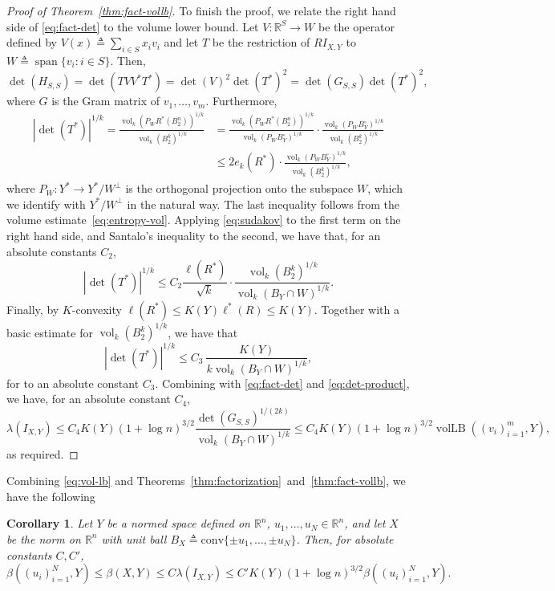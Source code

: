 \documentclass{article}
\newtheorem{corollary}[theorem]{Corollary}
\newcommand{\R}{{\mathbb{R}}}
\newcommand{\eqdef}{\triangleq}
\DeclareMathOperator{\vollb}{volLB}
\DeclareMathOperator{\vol}{vol}
\DeclareMathOperator{\lspan}{span}
\begin{document}
\begin{proof}[Proof of Theorem~\ref{thm:fact-vollb}]
  To finish the proof, we relate the right hand side of
  \eqref{eq:fact-det} to the volume lower bound. Let $V:\R^S \to W$ be
  the operator defined by $V(x) \eqdef \sum_{i \in S}{x_i v_i}$ and let $T$
  be the restriction of $RI_{X,Y}$ to $W \eqdef \lspan\{v_i: i \in
  S\}$. Then, 
  \begin{equation}\label{eq:det-product}
  \det(H_{S,S}) = \det(TVV^*T^*) = \det(V)^2\det(T^*)^2 =
  \det(G_{S,S}) \det(T^*)^2,
  \end{equation}
  where $G$ is the Gram matrix of $v_1, \ldots, v_m$. Furthermore,
  \begin{align*}
  |\det(T^*)|^{1/k} =
  \frac{\vol_k(P_WR^*(B_2^n))^{1/k}}{\vol_k(B_2^k)^{1/k}}
  &= \frac{\vol_k(P_WR^*(B_2^n))^{1/k}}{\vol_k(P_WB_Y^\circ)^{1/k}} \cdot 
  \frac{\vol_k(P_WB_Y^\circ)^{1/k}}{\vol_k(B_2^k)^{1/k}}\\
  &\le 2e_k(R^*) \cdot 
  \frac{\vol_k(P_WB_Y^\circ)^{1/k}}{\vol_k(B_2^k)^{1/k}},
  \end{align*}
  where $P_W:Y^* \to Y^*/W^\perp$ is the orthogonal projection onto
  the subspace $W$, which we identify with $Y^*/W^\perp$ in the natural
  way. The last inequality follows from the volume
  estimate~\eqref{eq:entropy-vol}. Applying \eqref{eq:sudakov} to the
  first term on the right hand side, and Santalo's inequality to the
  second, we have that, for an absolute constants $C_2$,
  \[
  |\det(T^*)|^{1/k} \le C_2 \frac{\ell(R^*)}{\sqrt{k}} \cdot
  \frac{\vol_k(B_2^k)^{1/k}}{\vol_k(B_Y \cap W)^{1/k}}. 
  \]
  Finally, by $K$-convexity $\ell(R^*) \le K(Y) \ell^*(R) \le
  K(Y)$. Together with a basic estimate for $\vol_k(B_2^k)^{1/k}$, we
  have that 
  \[
  |\det(T^*)|^{1/k} \le C_3\ \frac{K(Y)}{k\vol_k(B_Y \cap W)^{1/k}},
  \]
  for to an absolute constant $C_3$. Combining with \eqref{eq:fact-det} and
  \eqref{eq:det-product}, we have, for an absolute constant $C_4$,
  \[
  \lambda(I_{X,Y}) \le C_4K(Y) (1+\log n)^{3/2}  
  \frac{\det(G_{S,S})^{1/(2k)}}{\vol_k(B_Y \cap W)^{1/k}}
  \le C_4 K(Y) (1+\log n)^{3/2}  
  \vollb((v_i)_{i =  1}^m, Y),
  \]
  as required.
\end{proof}

Combining \eqref{eq:vol-lb} and
Theorems~\ref{thm:factorization}~and~\ref{thm:fact-vollb},
we have the following

\begin{corollary}
  Let $Y$ be a normed space defined on $\R^n$, $u_1, \ldots, u_N \in
  \R^n$, and let $X$ be the norm on $\R^n$ with unit ball $B_X
  \eqdef\mathrm{conv}\{\pm u_1, \ldots, \pm u_N\}$. Then, for absolute
  constants $C, C'$,
  \[
  \beta((u_i)_{i = 1}^N, Y) \le \beta(X,Y)
  \le C \lambda(I_{X,Y})
  \le C' K(Y) (1+\log n)^{3/2}  \beta((u_i)_{i = 1}^N, Y).
  \]
\end{corollary}



\end{document}
